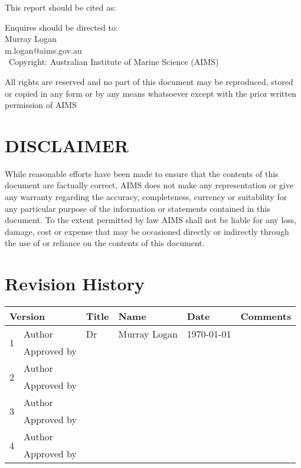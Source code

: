 This report should be cited as:

Enquires should be directed to:\\[1em]
Murray Logan\\
m.logan@aims.gov.au  \\[2em]

\textcopyright~Copyright: Australian Institute of Marine Science (AIMS) \the\year

All rights are reserved and no part of this document may be reproduced, stored or copied in any form or by any means whatsoever except with the prior written permission of AIMS


\part*{DISCLAIMER}
While reasonable efforts have been made to ensure that the contents of this document are factually correct, AIMS does not make any representation or give any warranty regarding the accuracy, completeness, currency or suitability for any particular purpose of the information or statements contained in this document. To the extent permitted by law AIMS shall not be liable for any loss, damage, cost or expense that may be occasioned directly or indirectly through the use of or reliance on the contents of this document.


\part*{Revision History}

\begin{tabular}{|l|l|l|p{4cm}|p{4cm}|p{3cm}|}
\hline
\multicolumn{2}{|l|}{Version} & Title & Name & Date & Comments\\
\hline
\multirow{2}{*}{1} & Author &Dr&Murray Logan&\today&\\
\cline{2-6}
 & Approved by & &&&\\
\hline
\multirow{2}{*}{2} & Author &&&&\\
\cline{2-6}
 & Approved by & &&&\\
\hline
\multirow{2}{*}{3} & Author &&&&\\
\cline{2-6}
 & Approved by & &&&\\
\hline
\multirow{2}{*}{4} & Author &&&&\\
\cline{2-6}
 & Approved by & &&&\\
\hline

\end{tabular}

\newpage

\tableofcontents
\newpage
\listoffigures
\newpage
\listoftables
\newpage

